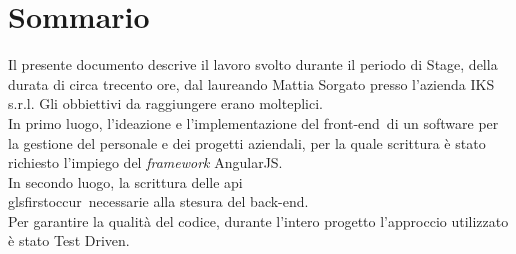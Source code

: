 
\cleardoublepage
{}
{}
\begingroup
\let\clearpage\relax
\let\cleardoublepage\relax
\let\cleardoublepage\relax

\chapter*{Sommario}

Il presente documento descrive il lavoro svolto durante il periodo di Stage, della durata di circa trecento ore, dal laureando Mattia Sorgato presso l'azienda IKS s.r.l. Gli obbiettivi da raggiungere erano molteplici.\\
In primo luogo, l'ideazione e l'implementazione del \gls{front-end}\glsfirstoccur\  di un software per la gestione del personale e dei progetti aziendali, per la quale scrittura è stato richiesto l'impiego del \emph{framework} AngularJS.\\
In secondo luogo, la scrittura delle \gls{api}\\glsfirstoccur\  necessarie alla stesura del \gls{back-end}\glsfirstoccur.\\
Per garantire la qualità del codice, durante l'intero progetto l'approccio utilizzato è stato Test Driven.

%
%

\endgroup			

\vfill

